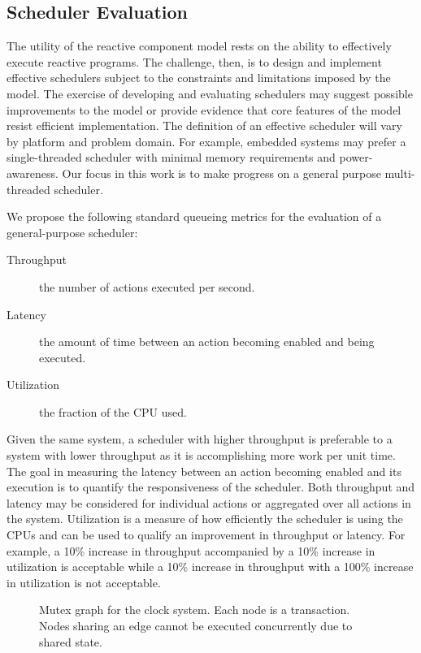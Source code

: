\subsection{Scheduler Evaluation}

The utility of the reactive component model rests on the ability to effectively execute reactive programs.
The challenge, then, is to design and implement effective schedulers subject to the constraints and limitations imposed by the model.
The exercise of developing and evaluating schedulers may suggest possible improvements to the model or provide evidence that core features of the model resist efficient implementation.
The definition of an effective scheduler will vary by platform and problem domain.
For example, embedded systems may prefer a single-threaded scheduler with minimal memory requirements and power-awareness.
Our focus in this work is to make progress on a general purpose multi-threaded scheduler.

We propose the following standard queueing metrics for the evaluation of a general-purpose scheduler:
\begin{description}
\item[Throughput] the number of actions executed per second.
\item[Latency] the amount of time between an action becoming enabled and being executed.
\item[Utilization] the fraction of the CPU used.
\end{description}
Given the same system, a scheduler with higher throughput is preferable to a system with lower throughput as it is accomplishing more work per unit time.
The goal in measuring the latency between an action becoming enabled and its execution is to quantify the responsiveness of the scheduler.
Both throughput and latency may be considered for individual actions or aggregated over all actions in the system.
Utilization is a measure of how efficiently the scheduler is using the CPUs and can be used to qualify an improvement in throughput or latency.
For example, a 10\% increase in throughput accompanied by a 10\% increase in utilization is acceptable while a 10\% increase in throughput with a 100\% increase in utilization is not acceptable.

\begin{figure}
\centering
{}%
\caption{Mutex graph for the clock system.  Each node is a transaction.  Nodes sharing an edge cannot be executed concurrently due to shared state. \label{clock_system_mutex}}
\end{figure}

